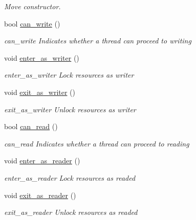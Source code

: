 \begin{DoxyCompactItemize}
\begin{DoxyCompactList}\small\item\em Move constructor. \end{DoxyCompactList}\item 
bool \mbox{\hyperlink{structthread__safety__t_ae6e20ce43a82ebd21e326bfe2d18f8bf}{can\+\_\+write}} ()
\begin{DoxyCompactList}\small\item\em can\+\_\+write Indicates whether a thread can proceed to writing \end{DoxyCompactList}\item 
\mbox{\label{structthread__safety__t_a283843684229e0d3460fa1830f383ee5}} 
void \mbox{\hyperlink{structthread__safety__t_a283843684229e0d3460fa1830f383ee5}{enter\+\_\+as\+\_\+writer}} ()
\begin{DoxyCompactList}\small\item\em enter\+\_\+as\+\_\+writer Lock resources as writer \end{DoxyCompactList}\item 
\mbox{\label{structthread__safety__t_a0b507f42c37d84d65519fb94a3d4af7a}} 
void \mbox{\hyperlink{structthread__safety__t_a0b507f42c37d84d65519fb94a3d4af7a}{exit\+\_\+as\+\_\+writer}} ()
\begin{DoxyCompactList}\small\item\em exit\+\_\+as\+\_\+writer Unlock resources as writer \end{DoxyCompactList}\item 
bool \mbox{\hyperlink{structthread__safety__t_abf2d3b518c725fb1997f7d05ab37c6fb}{can\+\_\+read}} ()
\begin{DoxyCompactList}\small\item\em can\+\_\+read Indicates whether a thread can proceed to reading \end{DoxyCompactList}\item 
\mbox{\label{structthread__safety__t_ac5a72d995157543333b4ae3b1e58be83}} 
void \mbox{\hyperlink{structthread__safety__t_ac5a72d995157543333b4ae3b1e58be83}{enter\+\_\+as\+\_\+reader}} ()
\begin{DoxyCompactList}\small\item\em enter\+\_\+as\+\_\+reader Lock resources as readed \end{DoxyCompactList}\item 
\mbox{\label{structthread__safety__t_ad6f7aeec450ce4b7c36882a5e0c2fa5d}} 
void \mbox{\hyperlink{structthread__safety__t_ad6f7aeec450ce4b7c36882a5e0c2fa5d}{exit\+\_\+as\+\_\+reader}} ()
\begin{DoxyCompactList}\small\item\em exit\+\_\+as\+\_\+reader Unlock resources as readed \end{DoxyCompactList}\end{DoxyCompactItemize}

